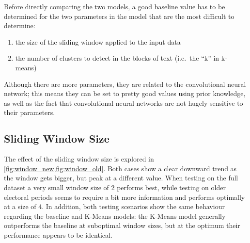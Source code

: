 Before directly comparing the two models, a good baseline value has to be
determined for the two parameters in the model that are the most difficult to
determine:
\begin{enumerate}
  \item the size of the sliding window applied to the input data
  \item the number of clusters to detect in the blocks of text (i.e.\ the ``k''
    in k-means)
\end{enumerate}
Although there are more parameters, they are related to the convolutional
neural network; this means they can be set to pretty good values using prior
knowledge, as well as the fact that convolutional neural networks are not hugely
sensitive to their parameters.

\subsection{Sliding Window Size}
The effect of the sliding window size is explored
in \cref{fig:window_new,fig:window_old}. Both cases show a clear downward trend as
the window gets bigger, but peak at a different value. When testing on the full
dataset a very small window size of 2 performs best, while testing on older
electoral periods seems to require a bit more information and performs optimally
at a size of 4. In addition, both testing scenarios show the same behaviour
regarding the baseline and K-Means models: the K-Means model generally
outperforms the baseline at suboptimal window sizes, but at the optimum their
performance appears to be identical.

